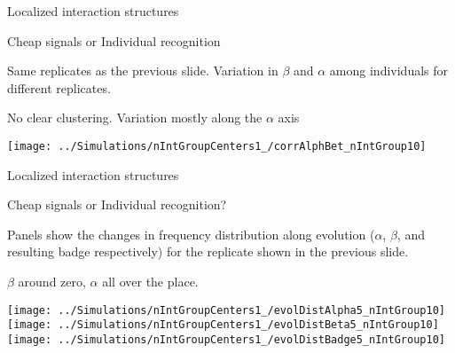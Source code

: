 \documentclass[
  ignorenonframetext,
]{beamer}
\begin{document}
\begin{frame}{Localized interaction structures}
\protect\hypertarget{localized-interaction-structures-4}{}

\begin{block}{Cheap signals or Individual recognition}

\small

Same replicates as the previous slide. Variation in \(\beta\) and
\(\alpha\) among individuals for different replicates.

No clear clustering. Variation mostly along the \(\alpha\) axis

\begin{center}\texttt{[image: ../Simulations/nIntGroupCenters1\_/corrAlphBet\_nIntGroup10]} \end{center}

\end{block}

\end{frame}

\begin{frame}{Localized interaction structures}
\protect\hypertarget{localized-interaction-structures-5}{}

\begin{block}{Cheap signals or Individual recognition?}

\small

Panels show the changes in frequency distribution along evolution
(\(\alpha\), \(\beta\), and resulting badge respectively) for the
replicate shown in the previous slide.

\(\beta\) around zero, \(\alpha\) all over the place.

\begin{flushleft}\texttt{[image: ../Simulations/nIntGroupCenters1\_/evolDistAlpha5\_nIntGroup10]} \texttt{[image: ../Simulations/nIntGroupCenters1\_/evolDistBeta5\_nIntGroup10]} \texttt{[image: ../Simulations/nIntGroupCenters1\_/evolDistBadge5\_nIntGroup10]} \end{flushleft}

\end{block}

\end{frame}
\end{document}
